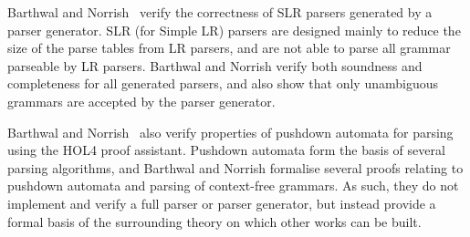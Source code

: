 	Barthwal and Norrish~\cite{barthwal09} verify the correctness of SLR
	parsers generated by a parser generator. SLR (for Simple LR) parsers are
	designed mainly to reduce the size of the parse tables from LR parsers, and
	are not able to parse all grammar parseable by LR parsers. Barthwal and
	Norrish verify both soundness and completeness for all generated parsers,
	and also show that only unambiguous grammars are accepted by the parser
	generator.

	Barthwal and Norrish~\cite{barthwal13} also verify properties of pushdown
	automata for parsing using the HOL4 proof assistant. Pushdown automata form
	the basis of several parsing algorithms, and Barthwal and Norrish formalise
	several proofs relating to pushdown automata and parsing of context-free
	grammars. As such, they do not implement and verify a full parser or parser
	generator, but instead provide a formal basis of the surrounding theory on
	which other works can be built.
